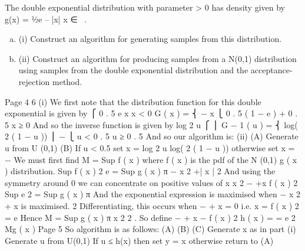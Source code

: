 \documentclass[a4paper,12pt]{article}
\begin{document}
The double exponential distribution with parameter \lambda  > 0 has density given by
g(x) = 1⁄2\lambda e – \lambda |x| x ∈ \ .

\begin{enumerate}[(a)]
\item (i) Construct an algorithm for generating samples from this distribution.
\item 
(ii) Construct an algorithm for producing samples from a N(0,1) distribution using
samples from the double exponential distribution and the acceptance-rejection
method.
\end{enumerate}



Page 4%
6
(i)
We first note that the distribution function for this double exponential is given
by
⎧
0 . 5 e \lambda  x
x < 0
G ( x ) = ⎨
− \lambda  x
⎩ 0 . 5 ( 1 − e ) + 0 . 5 x ≥ 0
And so the inverse function is given by
log 2 u
⎧
⎪
\lambda 
G − 1 ( u ) = ⎨
log( 2 ( 1 − u ))
⎪ −
\lambda 
⎩
u < 0 . 5
u ≥ 0 . 5
And so our algorithm is:
(ii)
(A) Generate u from U (0,1)
(B) If u < 0.5 set x =
log 2 u
log( 2 ( 1 − u ))
otherwise set x = −
\lambda 
\lambda 
We must first find M = Sup
f ( x )
where f ( x ) is the pdf of the N (0,1)
g ( x )
distribution.
Sup
f ( x )
2
e
= Sup
g ( x )
 π
−
x 2
+\lambda  | x |
2
And using the symmetry around 0 we can concentrate on positive values of x
x 2
− +\lambda  x
f ( x )
2
Sup
e 2
= Sup
g ( x )
 π
And the exponential expression is maximised when −
x 2
+ \lambda  x is maximised.
2
Differentiating, this occurs when − \lambda  + x = 0 i.e. x = \lambda 
f ( x )
2
=
e
Hence M = Sup
g ( x )  π
x 2
2 .
So define
− + \lambda  x −
f ( x )
2
h ( x ) =
= e 2
Mg ( x )
Page 5%
So algorithm is as follows:
(A)
(B)
(C)
Generate x as in part (i)
Generate u from U(0,1)
If u ≤ h(x) then set y = x otherwise return to (A)


\end{document}
